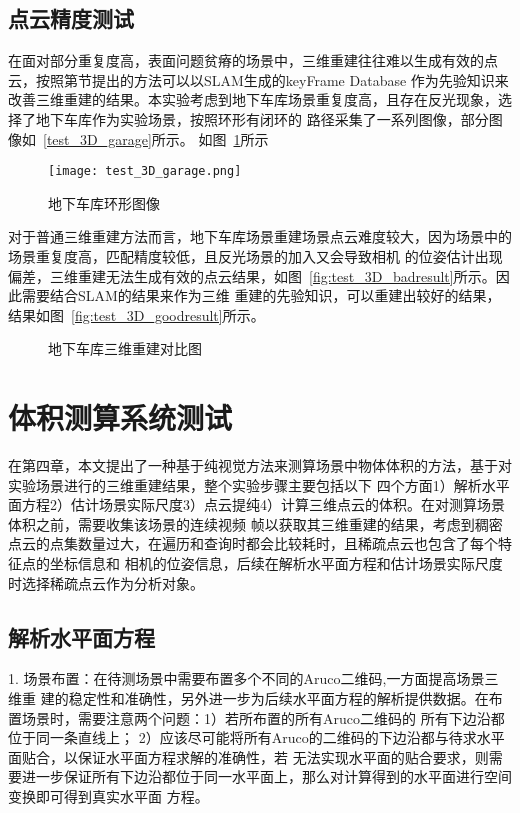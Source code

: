 \subsection{点云精度测试}
在面对部分重复度高，表面问题贫瘠的场景中，三维重建往往难以生成有效的点云，按照第节提出的方法可以以SLAM生成的keyFrame Database
作为先验知识来改善三维重建的结果。本实验考虑到地下车库场景重复度高，且存在反光现象，选择了地下车库作为实验场景，按照环形有闭环的
路径采集了一系列图像，部分图像如~\ref{test_3D_garage}所示。
如图~\ref{fig:test_3D_garage}所示
\begin{figure}[H] %
  \centering
  \texttt{[image: test\_3D\_garage.png]}
  \caption{地下车库环形图像}
  \label{fig:test_3D_garage}
  \end{figure}
对于普通三维重建方法而言，地下车库场景重建场景点云难度较大，因为场景中的场景重复度高，匹配精度较低，且反光场景的加入又会导致相机
的位姿估计出现偏差，三维重建无法生成有效的点云结果，如图~\ref{fig:test_3D_badresult}所示。因此需要结合SLAM的结果来作为三维
重建的先验知识，可以重建出较好的结果，结果如图~\ref{fig:test_3D_goodresult}所示。
  \begin{figure}[h]
  \centering
  \vskip0.5cm
  \caption{地下车库三维重建对比图}\label{fig:test_3D}
\end{figure}

\section{体积测算系统测试}
\label{sec:5.4}
在第四章，本文提出了一种基于纯视觉方法来测算场景中物体体积的方法，基于对实验场景进行的三维重建结果，整个实验步骤主要包括以下
四个方面1）解析水平面方程2）估计场景实际尺度3）点云提纯4）计算三维点云的体积。在对测算场景体积之前，需要收集该场景的连续视频
帧以获取其三维重建的结果，考虑到稠密点云的点集数量过大，在遍历和查询时都会比较耗时，且稀疏点云也包含了每个特征点的坐标信息和
相机的位姿信息，后续在解析水平面方程和估计场景实际尺度时选择稀疏点云作为分析对象。
\subsection{解析水平面方程}
\label{sec:5.4.1}
1.	场景布置：在待测场景中需要布置多个不同的Aruco二维码,一方面提高场景三维重
建的稳定性和准确性，另外进一步为后续水平面方程的解析提供数据。在布置场景时，需要注意两个问题：1）若所布置的所有Aruco二维码的
所有下边沿都位于同一条直线上； 2）应该尽可能将所有Aruco的二维码的下边沿都与待求水平面贴合，以保证水平面方程求解的准确性，若
无法实现水平面的贴合要求，则需要进一步保证所有下边沿都位于同一水平面上，那么对计算得到的水平面进行空间变换即可得到真实水平面
方程。

